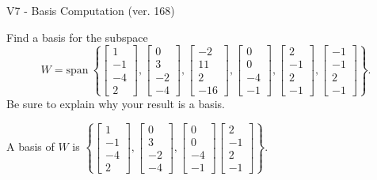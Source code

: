 \begin{exercise}
  \begin{exerciseTitle}V7 - Basis Computation (ver. 168)\end{exerciseTitle}
  \begin{exerciseStatement}
    Find a basis for the subspace 
\[W=\mathrm{span}\ \left\{\left[\begin{array}{r}
1 \\
-1 \\
-4 \\
2
\end{array}\right] , \left[\begin{array}{r}
0 \\
3 \\
-2 \\
-4
\end{array}\right] , \left[\begin{array}{r}
-2 \\
11 \\
2 \\
-16
\end{array}\right] , \left[\begin{array}{r}
0 \\
0 \\
-4 \\
-1
\end{array}\right] , \left[\begin{array}{r}
2 \\
-1 \\
2 \\
-1
\end{array}\right] , \left[\begin{array}{r}
-1 \\
-1 \\
2 \\
-1
\end{array}\right]\right\}.\]
 Be sure to explain why your result is a basis.


  \end{exerciseStatement}
  \begin{exerciseAnswer}
   A basis of \(W\) is  \(\left\{\left[\begin{array}{r}
1 \\
-1 \\
-4 \\
2
\end{array}\right] , \left[\begin{array}{r}
0 \\
3 \\
-2 \\
-4
\end{array}\right] , \left[\begin{array}{r}
0 \\
0 \\
-4 \\
-1
\end{array}\right] \left[\begin{array}{r}
2 \\
-1 \\
2 \\
-1
\end{array}\right]\right\}\).
  


  \end{exerciseAnswer}
\end{exercise}